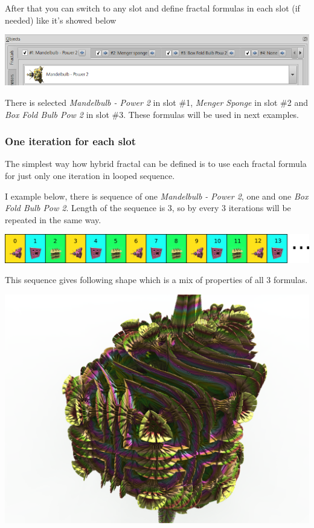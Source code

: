 After that you can switch to any slot and define fractal formulas in each slot (if needed) like it's showed below

\includegraphics[width=\linewidth]{img/manual/media/fractal_tabs_with_defined_fractals.png}

There is selected \emph{Mandelbulb - Power 2} in slot \#1, \emph{Menger Sponge} in slot \#2 and \emph{Box Fold Bulb Pow 2} in slot \#3. These formulas will be used in next examples.

\subsubsection{One iteration for each slot}

The simplest way how hybrid fractal can be defined is to use each fractal formula for just only one iteration in looped sequence.

I example below, there is sequence of one \emph{Mandelbulb - Power 2}, one  and one \emph{Box Fold Bulb Pow 2}. Length of the sequence is 3, so by every 3 iterations will be repeated in the same way.

\includegraphics[width=\linewidth]{img/manual/media/iteration_loop_hybrid_sequence_1.png}

This sequence gives following shape which is a mix of properties of all 3 formulas.
\nopagebreak

\includegraphics[width=0.7\linewidth]{img/manual/media/hybrid_sequence_example_1.png}

